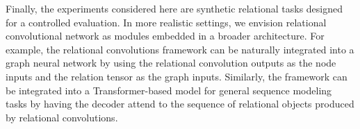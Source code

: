 Finally, the experiments considered here are synthetic relational tasks designed for a controlled evaluation. In more realistic settings, we envision relational convolutional network as modules embedded in a broader architecture. For example, the relational convolutions framework can be naturally integrated into a graph neural network by using the relational convolution outputs as the node inputs and the relation tensor as the graph inputs. Similarly, the framework can be integrated into a Transformer-based model for general sequence modeling tasks by having the decoder attend to the sequence of relational objects produced by relational convolutions.